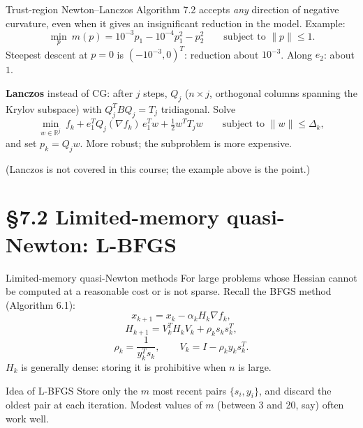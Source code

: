 \documentclass[aspectratio=169,12pt]{beamer}
\newcommand{\R}{\mathbb{R}}
\newcommand{\gradf}{\nabla f}
\begin{document}
\begin{frame}{Trust-region Newton--Lanczos}
  Algorithm 7.2 accepts \emph{any} direction of negative curvature, even when it gives an
  insignificant reduction in the model. Example:
  \[ \min_{p}\ m(p)=10^{-3}p_{1}-10^{-4}p_{1}^{2}-p_{2}^{2}\qquad\text{subject to }\|p\|\le 1 . \]
  Steepest descent at $p=0$ is $(-10^{-3},0)^{T}$: reduction about $10^{-3}$. Along $e_{2}$: about $1$.

  \vspace{0.3em}
  \textbf{Lanczos} instead of CG: after $j$ steps, $Q_{j}$ ($n\times j$, orthogonal columns spanning
  the Krylov subspace) with $Q_{j}^{T}BQ_{j}=T_{j}$ tridiagonal. Solve
  \[
    \min_{w\in\R^{j}}\ f_{k}+e_{1}^{T}Q_{j}(\gradf_{k})\,e_{1}^{T}w+\tfrac12w^{T}T_{j}w
    \qquad\text{subject to }\|w\|\le\Delta_{k} ,
    \tag{7.14}
  \]
  and set $p_{k}=Q_{j}w$. More robust; the subproblem is more expensive.

  \vspace{0.2em}
  {\small(Lanczos is not covered in this course; the example above is the point.)}
\end{frame}

\section{\S7.2 Limited-memory quasi-Newton: L-BFGS}

\begin{frame}{Limited-memory quasi-Newton methods}
  For large problems whose Hessian cannot be computed at a reasonable cost or is not
  sparse. Recall the BFGS method (Algorithm 6.1):
  \[ x_{k+1}=x_{k}-\alpha_{k}H_{k}\gradf_{k}, \tag{7.15} \]
  \[ H_{k+1}=V_{k}^{T}H_{k}V_{k}+\rho_{k}s_{k}s_{k}^{T}, \tag{7.16} \]
  \[ \rho_{k}=\frac{1}{y_{k}^{T}s_{k}},\qquad V_{k}=I-\rho_{k}y_{k}s_{k}^{T} . \tag{7.17} \]
  $H_{k}$ is generally dense: storing it is prohibitive when $n$ is large.

  \begin{block}{Idea of L-BFGS}
    Store only the \alert{$m$ most recent pairs} $\{s_{i},y_{i}\}$, and discard the oldest pair at each
    iteration. Modest values of $m$ (between 3 and 20, say) often work well.
  \end{block}
\end{frame}
\end{document}
